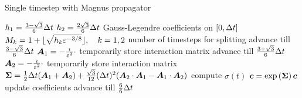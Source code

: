 \begin{algorithm}[h]
	\caption{Single timestep with Magnus propagator}
	\label{alg:magnus}
	\begin{algorithmic}
	\State
		\State
		\State $h_1 = \frac{3-\sqrt{3}}{6} \Delta t$ $h_2 = \frac{2\sqrt{3}}{6} \Delta t$
		\Comment Gauss-Legendre coefficients on $[0,\Delta t]$
		\State $M_{k} = 1 + \lfloor \sqrt{h_{k} \varepsilon^{-3/8}} \rfloor, \quad k=1,2$
		\Comment number of timesteps for splitting
		\State
		\State {}
		\Comment advance till $\frac{3-\sqrt{3}}{6} \Delta t$
		\State $\bm{A}_1 = - \frac{\imath}{\varepsilon^2} \cdot$ 
		\Comment temporarily store interaction matrix
		\State {}
		\Comment advance till $\frac{3+\sqrt{3}}{6} \Delta t$
		\State $\bm{A}_2 = - \frac{\imath}{\varepsilon^2} \cdot$ 
		\Comment temporarily store interaction matrix
		\State $\bm{\Sigma} = \frac{1}{2} \Delta t (\bm{A}_1 + \bm{A}_2) + \frac{\sqrt{3}}{12} (\Delta t)^2 (\bm{A}_2 \cdot \bm{A}_1 - \bm{A}_1 \cdot \bm{A}_2)$
		\Comment compute $\sigma (t)$
		\State $\bm{c} = \exp \left( \bm{\Sigma} \right) \bm{c}$
		\Comment update coefficients
		\State {}
		\Comment advance till $\frac{6}{6} \Delta t$
		\State
	\EndProcedure
	\end{algorithmic}
\end{algorithm}

